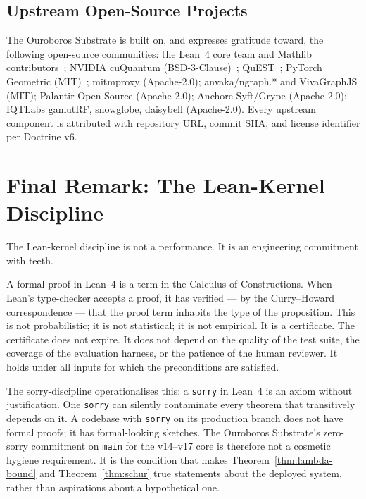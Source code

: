 \subsection{Upstream Open-Source Projects}

The Ouroboros Substrate is built on, and expresses gratitude toward, the
following open-source communities: the Lean~4 core team and Mathlib
contributors~\cite{moura2021lean4,mathlib2020}; NVIDIA cuQuantum
(BSD-3-Clause)~\cite{nvidia2023cuquantum}; QuEST~\cite{jones2019quest};
PyTorch Geometric (MIT)~\cite{fey2019fast}; mitmproxy (Apache-2.0);
anvaka/ngraph.* and VivaGraphJS (MIT); Palantir Open Source (Apache-2.0);
Anchore Syft/Grype (Apache-2.0); IQTLabs gamutRF, snowglobe, daisybell
(Apache-2.0).
Every upstream component is attributed with repository URL, commit SHA,
and license identifier per Doctrine v6.


\section{Final Remark: The Lean-Kernel Discipline}
\label{sec:lean-final}

The Lean-kernel discipline is not a performance.
It is an engineering commitment with teeth.

\medskip

A formal proof in Lean~4 is a term in the Calculus of Constructions.
When Lean's type-checker accepts a proof, it has verified --- by the
Curry--Howard correspondence --- that the proof term inhabits the type of
the proposition.
This is not probabilistic; it is not statistical; it is not empirical.
It is a certificate.
The certificate does not expire.
It does not depend on the quality of the test suite, the coverage of the
evaluation harness, or the patience of the human reviewer.
It holds under all inputs for which the preconditions are satisfied.

\medskip

The sorry-discipline operationalises this: a \texttt{sorry} in Lean~4 is
an axiom without justification.
One \texttt{sorry} can silently contaminate every theorem that transitively
depends on it.
A codebase with \texttt{sorry} on its production branch does not have
formal proofs; it has formal-looking sketches.
The Ouroboros Substrate's zero-sorry commitment on \texttt{main} for the
v14--v17 core is therefore not a cosmetic hygiene requirement.
It is the condition that makes Theorem~\ref{thm:lambda-bound} and
Theorem~\ref{thm:schur} true statements about the deployed system,
rather than aspirations about a hypothetical one.

